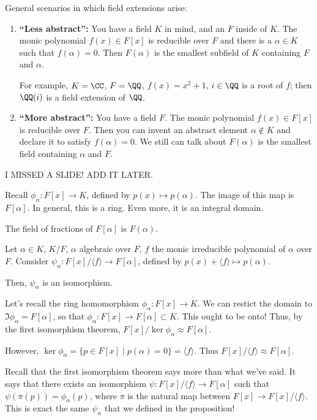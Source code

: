 
General scenarios in which field extensions arise:
\begin{enumerate}
	\item \textbf{``Less abstract'':} You have a field $K$ in mind, and an $F$ inside of $K$. The monic polynomial $f(x) \in F[x]$ is reducible over $F$ and there is a $\alpha \in K$ such that $f(\alpha) = 0$. Then $F(\alpha)$ is the smallest subfield of $K$ containing $F$ and $\alpha$.

		For example, $K = \CC$, $F = \QQ$, $f(x) = x^2 + 1$,  $i \in \QQ$ is a root of $f$; then $\QQ(i)$ is a field extension of $\QQ$.

	\item \textbf{``More abstract'':} You have a field $F$. The monic polynomial $f(x) \in F[x]$ is reducible over $F$. Then you can invent an abstract element $\alpha \not\in K$ and declare it to satisfy $f(\alpha) = 0$. We still can talk about $F(\alpha)$ is the smallest field containing $\alpha$ and $F$.
\end{enumerate}

I MISSED A SLIDE! ADD IT LATER.

Recall $\phi_\alpha: F[x] \to K$, defined by $p(x) \mapsto p(\alpha)$. The image of this map is $F[\alpha]$. In general, this is a ring. Even more, it is an integral domain.

The field of fractions of $F[\alpha]$ is $F(\alpha)$.

\begin{prop}
	Let $\alpha \in K$, $K / F$, $\alpha$ algebraic over $F$, $f$ the monic irreducible polynomial of $\alpha$ over $F$.
	Consider $\psi_\alpha: F[x]/ \langle f \rangle \to F[\alpha]$, defined by $p(x) + \langle f \rangle \mapsto p(\alpha)$.

	Then, $\psi_\alpha$ is an isomorphism.
\end{prop}

\begin{dem}
	Let's recall the ring homomorphism $\phi_\alpha: F[x] \to K$. We can restict the domain to $\Im\phi_\alpha = F[\alpha]$, so that $\phi_\alpha: F[x] \to F[\alpha] \subset K$. This ought to be onto! Thus, by the first isomorphism theorem, $F[x]/\ker\phi_\alpha \approx F[\alpha]$.

	However, $\ker\phi_\alpha = \{ p \in F[x] \mid p(\alpha) = 0\} = \langle f \rangle$. Thus $F[x]/ \langle f \rangle \approx F[\alpha]$.

	Recall that the first isomorphism theorem says more than what we've said. It says that there exists an isomorphism $\psi: F[x]/ \langle f \rangle \to F[\alpha]$ such that $\psi(\pi(p)) = \phi_\alpha(p)$, where $\pi$ is the natural map between $F[x] \to F[x]/ \langle f \rangle$. This is exact the same $\psi_\alpha$ that we defined in the proposition!
\end{dem}

